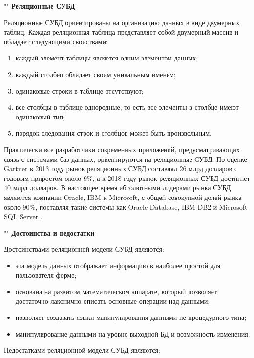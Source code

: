 \documentclass[a4paper]{bmstu}
\begin{document}
""\newline
\noindent\textbf{Реляционные СУБД}

Реляционные СУБД ориентированы на организацию данных в виде двумерных таблиц. Каждая реляционная таблица представляет собой двумерный массив и обладает следующими свойствами:

\begin{enumerate}
	\item каждый элемент таблицы является одним элементом данных;
	\item каждый столбец обладает своим уникальным именем;
	\item одинаковые строки в таблице отсутствуют;
	\item все столбцы в таблице однородные, то есть все элементы в столбце имеют одинаковый тип;
	\item порядок следования строк и столбцов может быть произвольным.
\end{enumerate}

Практически все разработчики современных приложений, предусматривающих связь с системами баз данных, ориентируются на реляционные СУБД. По оценке Gartner в 2013 году рынок реляционных СУБД составлял 26 млрд долларов с годовым приростом около 9\%, а к 2018 году рынок реляционных СУБД достигнет 40 млрд долларов. В настоящее время абсолютными лидерами рынка СУБД являются компании Oracle, IBM и Microsoft, с общей совокупной долей рынка около 90\%, поставляя такие системы как Oracle Database, IBM DB2 и Microsoft SQL Server \cite{dbms}.

""\newline
\noindent\textbf{Достоинства и недостатки}

Достоинствами реляционной модели СУБД являются:

\begin{itemize}
	\item эта модель данных отображает информацию в наиболее простой для пользователя форме;
	\item основана на развитом математическом аппарате, который позволяет достаточно лаконично описать основные операции над данными;
	\item позволяет создавать языки манипулирования данными не процедурного типа;
	\item манипулирование данными на уровне выходной БД и возможность изменения.
\end{itemize}

Недостатками реляционной модели СУБД являются:
\end{document}

